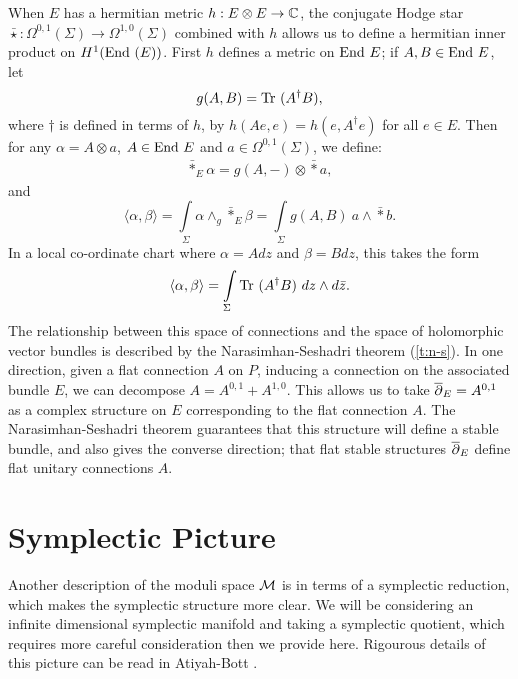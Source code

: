 	When $E$ has a hermitian metric $h:E\otimes E \to \mathbb{C}$, the conjugate Hodge star $\bar{\star}:\Omega^{0,1}(\Sigma) \to \Omega^{1,0}(\Sigma)$ combined with $h$ allows us to define a hermitian inner product on $H^1(\text{End } (E))$.  First $h$ defines a metric on $\text{End } E$; if $A,B\in \text{End } E$, let
	\begin{equation}
	g(A,B) = \text{Tr }(A^\dagger B),
	\end{equation}
	where $\dagger$ is defined in terms of $h$, by $h(Ae,e) = h(e,A^\dagger e)$ for all $e\in E$. Then for any $\alpha = A \otimes a$, $A\in \text{End } E$ and $a \in \Omega^{0,1}(\Sigma)$, we define:
	\begin{align}
	\bar{\ast}_E \alpha = g(A,-)\otimes \bar{\ast}a, 
	\end{align}
	and
	\begin{equation}
	\langle \alpha, \beta \rangle = \int\limits_\Sigma \alpha \wedge_g \bar{\ast}_E \beta =\int\limits_\Sigma g(A,B)~a\wedge \bar{\ast} b.
	\end{equation}
	In a local co-ordinate chart where $\alpha = Adz$ and $\beta = Bdz$, this takes the form
	\begin{equation}
	\langle \alpha, \beta \rangle = \int\limits_\Sigma \text{Tr }(A^\dagger B)~dz\wedge d\bar{z}.
	\end{equation}
	The relationship between this space of connections and the space of holomorphic vector bundles is described by the Narasimhan-Seshadri theorem (\ref{t:n-s}). In one direction, given a flat connection $A$ on $P$, inducing a connection on the associated bundle $E$, we can decompose $A = A^{0,1} + A^{1,0}$. This allows us to take $\overline{\partial}_E = A^{0,1}$ as a complex structure on $E$ corresponding to the flat connection $A$. The Narasimhan-Seshadri theorem guarantees that this structure will define a stable bundle, and also gives the converse direction; that flat stable structures $\overline{\partial}_E$ define flat unitary connections $A$. 

	\section{Symplectic Picture}
	Another description of the moduli space $\mathcal{M}$ is in terms of a symplectic reduction, which makes the symplectic structure more clear. We will be considering an infinite dimensional symplectic manifold and taking a symplectic quotient, which requires more careful consideration then we provide here. Rigourous details of this picture can be read in Atiyah-Bott \cite{atiyah_yang-mills_1983}.
	

